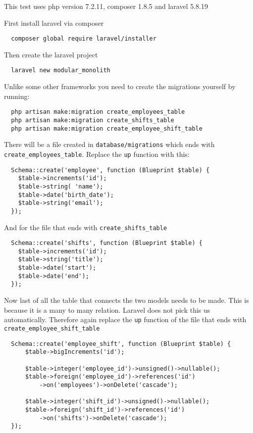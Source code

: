 This test uses php version 7.2.11, composer 1.8.5 and laravel 5.8.19

First install laravel via composer
\begin{verbatim}
  composer global require laravel/installer
\end{verbatim}

Then create the laravel project
\begin{verbatim}
  laravel new modular_monolith
\end{verbatim}

Unlike some other frameworks you need to create the migrations yourself by running:
\begin{verbatim}
  php artisan make:migration create_employees_table
  php artisan make:migration create_shifts_table
  php artisan make:migration create_employee_shift_table
\end{verbatim}

There will be a file created in \texttt{database/migrations} which ends with \texttt{create\_employees\_table}. Replace the \texttt{up} function with this:
\begin{verbatim}
  Schema::create('employee', function (Blueprint $table) {
    $table->increments('id');
    $table->string( 'name');
    $table->date('birth_date');
    $table->string('email');
  });
\end{verbatim}

And for the file that ends with \texttt{create\_shifts\_table}
\begin{verbatim}
  Schema::create('shifts', function (Blueprint $table) {
    $table->increments('id');
    $table->string('title');
    $table->date('start');
    $table->date('end');
  });
\end{verbatim}

Now last of all the table that connects the two models needs to be made. This is because it is a many to many relation. Laravel does not pick this us automatically. Therefore again replace the \texttt{up} function of the file that ends with \texttt{create\_employee\_shift\_table} 
\begin{verbatim}
  Schema::create('employee_shift', function (Blueprint $table) {
      $table->bigIncrements('id');
      
      $table->integer('employee_id')->unsigned()->nullable();
      $table->foreign('employee_id')->references('id')
          ->on('employees')->onDelete('cascade');

      $table->integer('shift_id')->unsigned()->nullable();
      $table->foreign('shift_id')->references('id')
          ->on('shifts')->onDelete('cascade');
  });
\end{verbatim}

